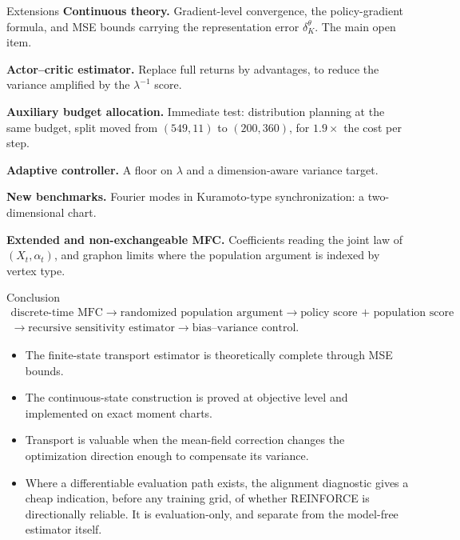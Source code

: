 \documentclass[9pt]{beamer}
\begin{document}
\begin{frame}{Extensions}
\small
\textbf{Continuous theory.} Gradient-level convergence, the policy-gradient formula, and MSE bounds carrying the representation error $\delta_K^\theta$. The main open item.

\vspace{0.25cm}
\textbf{Actor--critic estimator.} Replace full returns by advantages, to reduce the variance amplified by the $\lambda^{-1}$ score.

\vspace{0.25cm}
\textbf{Auxiliary budget allocation.} Immediate test: distribution planning at the same budget, split moved from $(549,11)$ to $(200,360)$, for $1.9\times$ the cost per step.

\vspace{0.25cm}
\textbf{Adaptive controller.} A floor on $\lambda$ and a dimension-aware variance target.

\vspace{0.25cm}
\textbf{New benchmarks.} Fourier modes in Kuramoto-type synchronization: a two-dimensional chart.

\vspace{0.25cm}
\textbf{Extended and non-exchangeable MFC.} Coefficients reading the joint law of $(X_t,\alpha_t)$, and graphon limits where the population argument is indexed by vertex type.
\end{frame}

\begin{frame}{Conclusion}
\small
\[
\begin{array}{c}
  \text{discrete-time MFC}
  \longrightarrow
  \text{randomized population argument}
  \longrightarrow
  \text{policy score + population score}\\[2pt]
  \longrightarrow
  \text{recursive sensitivity estimator}
  \longrightarrow
  \text{bias--variance control}.
\end{array}
\]

\vspace{0.2cm}
\begin{itemize}
  \item The finite-state transport estimator is theoretically complete through MSE bounds.
  \item The continuous-state construction is proved at objective level and implemented on exact moment charts.
  \item Transport is valuable when the mean-field correction changes the optimization direction enough to compensate its variance.
  \item Where a differentiable evaluation path exists, the alignment diagnostic gives a cheap indication, before any training grid, of whether REINFORCE is directionally reliable. It is evaluation-only, and separate from the model-free estimator itself.
\end{itemize}
\end{frame}
\end{document}
